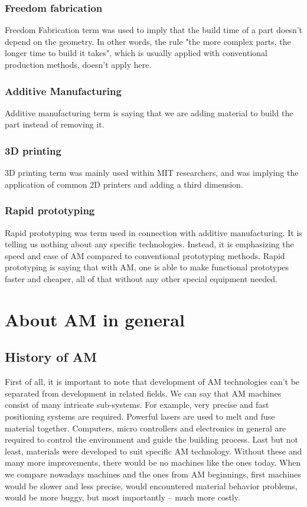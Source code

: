 \documentclass[a4paper, twoside, 11pt]{report}
\begin{document}
\subsection{Freedom fabrication}
Freedom Fabrication term was used to imply that the build time of a part doesn't depend on the geometry. In other words, the rule "the more complex parts, the longer time to build it takes", which is usually applied with conventional production methods, doesn't apply here.
\subsection{Additive Manufacturing}
Additive manufacturing term is saying that we are adding material to build the part instead of removing it.
\subsection{3D printing}
3D printing term was mainly used within MIT researchers, and was implying the application of common 2D printers and adding a third dimension.
\subsection{Rapid prototyping}
Rapid prototyping was term used in connection with additive manufacturing. It is telling us nothing about any specific technologies. Instead, it is emphasizing the speed and ease of AM compared to conventional prototyping methods. Rapid prototyping is saying that with AM, one is able to make functional prototypes faster and cheaper, all of that without any other special equipment needed.\\

%
%
%
\chapter{About AM in general}
%
\section{History of AM}
First of all, it is important to note that development of AM technologies can't be separated from development in related fields. We can say that AM machines consist of many intricate sub-systems. For example, very precise and fast positioning systems are required. Powerful lasers are used to melt and fuse material together. Computers, micro controllers and electronics in general are required to control the environment and guide the building process. Last but not least, materials were developed to suit specific AM technology. Without these and many more improvements, there would be no machines like the ones today. When we compare nowadays machines and the ones from AM beginnings, first machines would be slower and less precise, would encountered material behavior problems, would be more buggy, but most importantly – much more costly.
\end{document}
